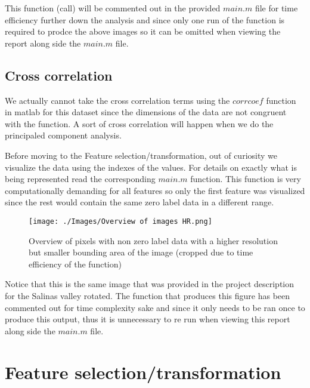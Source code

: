 \documentclass[12pt, a4paper]{article}
\begin{document}
This function (call) will be commented out in the provided $main.m$ file for time efficiency further down the analysis and since only one run of the function is required to prodce the above images so it can be omitted when viewing the report along side the $main.m$ file.
\newline

\subsection{Cross correlation} \label{cross}

We actually cannot take the cross correlation terms using the $corrcoef$ function in matlab for this dataset since the dimensions of the data are not congruent with the function. A sort of cross correlation will happen when we do the principaled component analysis.
\newline

Before moving to the Feature selection/transformation, out of curiosity we visualize the data using the indexes of the values. For details on exactly what is being represented read the corresponding $main.m$ function. This function is very computationally demanding for all features so only the first feature was visualized since the rest would contain the same zero label data in a different range.
\newline

\begin{figure}[H]
    \begin{center}
        \texttt{[image: ./Images/Overview of images HR.png]}
    \end{center}
    \caption{Overview of pixels with non zero label data with a higher resolution but smaller bounding area of the image (cropped due to time efficiency of the function)}\label{fig:overview hd}
\end{figure}

Notice that this is the same image that was provided in the project description for the Salinas valley rotated. The function that produces this figure has been commented out for time complexity sake and since it only needs to be ran once to produce this output, thus it is unnecessary to re run when viewing this report along side the $main.m$ file.

\section{Feature selection/transformation}
\end{document}
